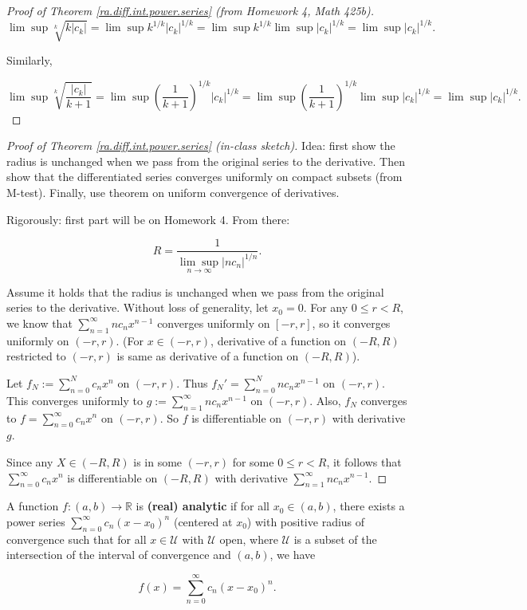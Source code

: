 \begin{proof}[Proof of Theorem \ref{ra.diff.int.power.series} (from Homework 4, Math 425b)]
\[
\lim \sup \sqrt[k]{k |c_k|} = \lim \sup k^{1/k} |c_k|^{1/k} =  \lim \sup k^{1/k} \lim \sup  |c_k|^{1/k} =  \lim \sup  |c_k|^{1/k} .
\] 

Similarly,

\[
\lim \sup \sqrt[k]{\frac{|c_k|}{k+1}}= \lim \sup \left( \frac{1}{k+1} \right)^{1/k} |c_k|^{1/k} =  \lim \sup \left( \frac{1}{k+1} \right)^{1/k}  \lim \sup  |c_k|^{1/k} =  \lim \sup  |c_k|^{1/k} .
\] 

\end{proof}

\begin{proof}[Proof of Theorem \ref{ra.diff.int.power.series} (in-class sketch)]

Idea: first show the radius is unchanged when we pass from the original series to the derivative. Then show that the differentiated series converges uniformly on compact subsets (from M-test). Finally, use theorem on uniform convergence of derivatives.

Rigorously: first part will be on Homework 4. From there:

\[
R = \frac{1}{\underset{n \to \infty}{\lim \sup} |n c_n|^{1/n}} .
\]

Assume it holds that the radius is unchanged when we pass from the original series to the derivative. Without loss of generality, let \(x_0 = 0\). For any \(0 \leq r < R\), we know that \(\sum_{n=1}^\infty n c_n x^{n-1}\) converges uniformly on \([-r, r]\), so it converges uniformly on \((-r,r)\). (For \(x \in (-r, r)\), derivative of a function on \((-R, R)\) restricted to \((-r, r)\) is same as derivative of a function on \((-R, R)\)).

Let \(f_N := \sum_{n=0}^N c_n x^n\) on \((-r,r)\). Thus \(f_N' = \sum_{n=0}^N n c_n x^{n-1}\) on \((-r,r)\). This converges uniformly to \(g:= \sum_{n=1}^\infty n c_n x^{n-1}\) on \((-r,r)\). Also, \(f_N\) converges to \(f = \sum_{n=0}^\infty c_n x^n\) on \((-r,r)\). So \(f\) is differentiable on \((-r,r)\) with derivative \(g\).

Since any \(X \in (-R, R)\) is in some \((-r, r)\) for some \(0 \leq r < R\), it follows that \(\sum_{n=0}^\infty c_n x^n\) is differentiable on \((-R, R)\) with derivative \(\sum_{n=1}^\infty n c_n x^{n-1}\). 

\end{proof}


\begin{definition}

A function \(f: (a, b) \to \mathbb{R}\) is \textbf{(real) analytic} if for all \(x_0 \in (a,b)\), there exists a power series \(\sum_{n=0}^\infty c_n(x - x_0)^n\) (centered at \(x_0\)) with positive radius of convergence such that for all \(x \in \mathcal{U}\) with \(\mathcal{U}\) open, where \(\mathcal{U}\) is a subset of the intersection of the interval of convergence and \((a,b)\), we have

\[
f(x) = \sum_{n=0}^\infty c_n(x -x_0)^n.
\]

\end{definition}

